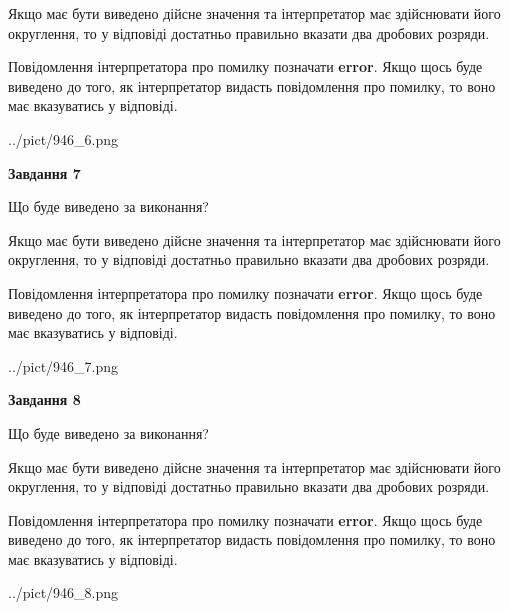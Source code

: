 \documentclass[12pt, ukrainian]{article}
\begin{document}
{\begin {Large}
Якщо має бути виведено дійсне значення та інтерпретатор має здійснювати його округлення, 
то у відповіді достатньо правильно вказати два дробових розряди.

Повідомлення інтерпретатора про помилку позначати \textbf{error}.
Якщо щось буде виведено до того, як інтерпретатор видасть повідомлення про помилку, 
то воно має вказуватись у відповіді. \par

\begin{center}
	{../pict/946_6.png}
\end{center}
\newpage

{\begin {center}\textbf{Завдання 7}\end {center}}\par
Що буде виведено за виконання? \par

Якщо має бути виведено дійсне значення та інтерпретатор має здійснювати його округлення, 
то у відповіді достатньо правильно вказати два дробових розряди.

Повідомлення інтерпретатора про помилку позначати \textbf{error}.
Якщо щось буде виведено до того, як інтерпретатор видасть повідомлення про помилку, 
то воно має вказуватись у відповіді. \par

\begin{center}
	{../pict/946_7.png}
\end{center}
\newpage

{\begin {center}\textbf{Завдання 8}\end {center}}\par
Що буде виведено за виконання? \par

Якщо має бути виведено дійсне значення та інтерпретатор має здійснювати його округлення, 
то у відповіді достатньо правильно вказати два дробових розряди.

Повідомлення інтерпретатора про помилку позначати \textbf{error}.
Якщо щось буде виведено до того, як інтерпретатор видасть повідомлення про помилку, 
то воно має вказуватись у відповіді. \par

\begin{center}
	{../pict/946_8.png}
\end{center}
\newpage


\end{Large}}
\end{document}

